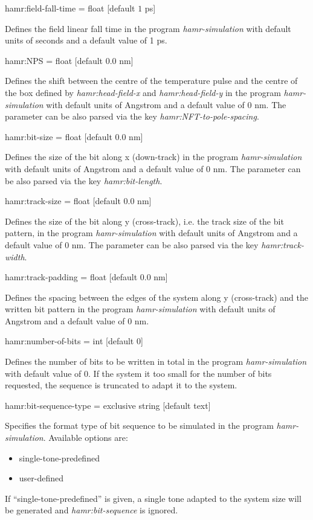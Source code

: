 {\zicf hamr:field-fall-time = float [default $1$ ps]}
Defines the field linear fall time in the program \textit{hamr-simulation} with default units of seconds and a default value of 1 ps.

{\zicf hamr:NPS = float [default $0.0$ nm]}
Defines the shift between the centre of the temperature pulse and the centre of the box defined by \textit{hamr:head-field-x} and \textit{hamr:head-field-y}
in the program \textit{hamr-simulation} with default units of Angstrom and a default value of 0 nm.
The parameter can be also parsed via the key \textit{hamr:NFT-to-pole-spacing}.

{\zicf hamr:bit-size = float [default $0.0$ nm]}
Defines the size of the bit along x (down-track)
in the program \textit{hamr-simulation} with default units of Angstrom and a default value of 0 nm.
The parameter can be also parsed via the key \textit{hamr:bit-length}.

{\zicf hamr:track-size = float [default $0.0$ nm]}
Defines the size of the bit along y (cross-track), i.e. the track size of the bit pattern,
in the program \textit{hamr-simulation} with default units of Angstrom and a default value of 0 nm.
The parameter can be also parsed via the key \textit{hamr:track-width}.

{\zicf hamr:track-padding = float [default $0.0$ nm]}
Defines the spacing between the edges of the system along y (cross-track) and the written bit pattern
in the program \textit{hamr-simulation} with default units of Angstrom and a default value of 0 nm.

{\zicf hamr:number-of-bits = int [default $0$]}
Defines the number of bits to be written in total in the program \textit{hamr-simulation} with default value of 0.
If the system it too small for the number of bits requested, the sequence is truncated to adapt it to the system.

{\zicf hamr:bit-sequence-type =  exclusive string [default text]}
Specifies the format type of bit sequence to be simulated in the program \textit{hamr-simulation}. Available options are:
\begin{itemize}
	\item[] single-tone-predefined
	\item[] user-defined
\end{itemize}
If ``single-tone-predefined'' is given, a single tone adapted to the system size will be generated and \textit{ hamr:bit-sequence} is ignored.

